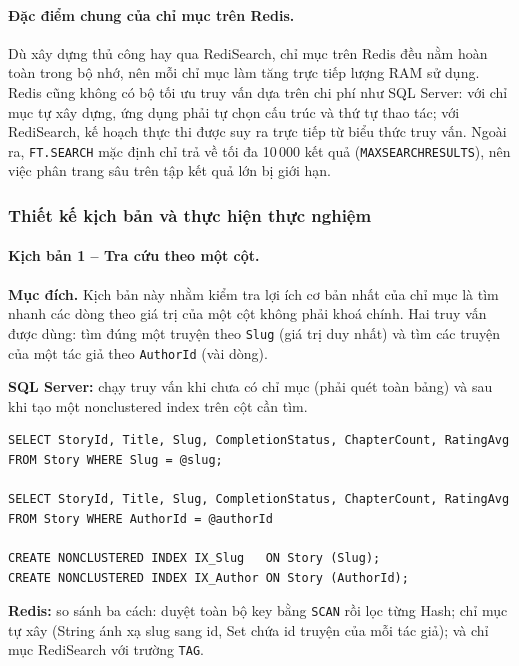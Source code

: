 \paragraph{Đặc điểm chung của chỉ mục trên Redis.} Dù xây dựng thủ công hay qua RediSearch, chỉ mục trên Redis đều nằm hoàn toàn trong bộ nhớ, nên mỗi chỉ mục làm tăng trực tiếp lượng RAM sử dụng. Redis cũng không có bộ tối ưu truy vấn dựa trên chi phí như SQL Server: với chỉ mục tự xây dựng, ứng dụng phải tự chọn cấu trúc và thứ tự thao tác; với RediSearch, kế hoạch thực thi được suy ra trực tiếp từ biểu thức truy vấn. Ngoài ra, \texttt{FT.SEARCH} mặc định chỉ trả về tối đa 10\,000 kết quả (\texttt{MAXSEARCHRESULTS}), nên việc phân trang sâu trên tập kết quả lớn bị giới hạn.

\subsubsection{Thiết kế kịch bản và thực hiện thực nghiệm}
\label{subsubsec:indexing-experiment}

\paragraph{Kịch bản 1 -- Tra cứu theo một cột.}

\textbf{Mục đích.} Kịch bản này nhằm kiểm tra lợi ích cơ bản nhất của chỉ mục là tìm nhanh các dòng theo giá trị của một cột không phải khoá chính. Hai truy vấn được dùng: tìm đúng một truyện theo \texttt{Slug} (giá trị duy nhất) và tìm các truyện của một tác giả theo \texttt{AuthorId} (vài dòng).

\textbf{SQL Server:} chạy truy vấn khi chưa có chỉ mục (phải quét toàn bảng) và sau khi tạo một nonclustered index trên cột cần tìm.

\begin{verbatim}
SELECT StoryId, Title, Slug, CompletionStatus, ChapterCount, RatingAvg
FROM Story WHERE Slug = @slug;

SELECT StoryId, Title, Slug, CompletionStatus, ChapterCount, RatingAvg
FROM Story WHERE AuthorId = @authorId

CREATE NONCLUSTERED INDEX IX_Slug   ON Story (Slug);
CREATE NONCLUSTERED INDEX IX_Author ON Story (AuthorId);
\end{verbatim}

\textbf{Redis:} so sánh ba cách: duyệt toàn bộ key bằng \texttt{SCAN} rồi lọc từng Hash; chỉ mục tự xây (String ánh xạ slug sang id, Set chứa id truyện của mỗi tác giả); và chỉ mục RediSearch với trường \texttt{TAG}.

